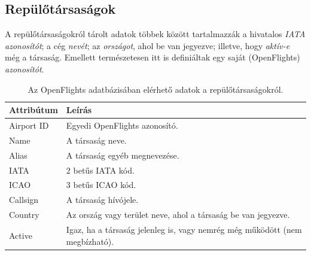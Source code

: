    \subsection{Repülőtársaságok}
    A repülőtársaságokról tárolt adatok többek között tartalmazzák a hivatalos \textit{IATA azonosítót}; a cég \textit{nevét}; az \textit{országot}, ahol be van jegyezve; illetve, hogy \textit{aktív-e} még a társaság. Emellett természetesen itt is definiáltak egy saját (OpenFlights) \textit{azonosítót}.

    \begin{table}[ht]
      \footnotesize
      \centering
      \begin{tabular}{ | l | l |}
      \hline
      Attribútum & Leírás \\ \hline
      Airport ID & Egyedi OpenFlights azonosító.\\
      Name & A társaság neve.\\
      Alias & A társaság egyéb megnevezése.\\
      IATA & 2 betűs IATA kód.\\
      ICAO & 3 betűs ICAO kód.\\
      Callsign & A társaság hívójele.\\
      Country & Az ország vagy terület neve, ahol a társaság be van jegyezve.\\
      Active & Igaz, ha a társaság jelenleg is, vagy nemrég még működött (nem megbízható).\\
      \hline
      \end{tabular}
      \caption{Az OpenFlights adatbázisában elérhető adatok a repülőtársaságokról.}
      \label{tab:table_repulesitarsasagok}
    \end{table}

